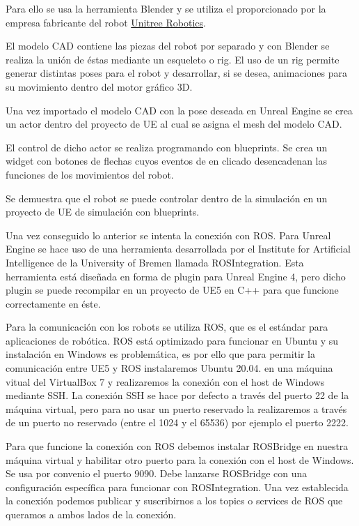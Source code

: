 \documentclass[a4paper, 12pt, spanish, twoside]{article}
\begin{document}
Para ello se usa la herramienta Blender y se utiliza el  proporcionado por la empresa fabricante del robot \href{https://www.unitree.com/}{Unitree Robotics}.  

El modelo CAD contiene las piezas del robot por separado y con Blender se realiza la unión de éstas mediante un esqueleto o rig. El uso de un rig permite generar distintas poses para el robot y desarrollar, si se desea, animaciones para su movimiento dentro del motor gráfico 3D. 

Una vez importado el modelo CAD con la pose deseada en Unreal Engine se crea un actor dentro del proyecto de UE al cual se asigna el mesh del modelo CAD.  

El control de dicho actor se realiza programando con blueprints. Se crea un widget con botones de flechas cuyos eventos de en clicado desencadenan las funciones de los movimientos del robot. 

Se demuestra que el robot se puede controlar dentro de la simulación en un proyecto de UE de simulación con blueprints. 


Una vez conseguido lo anterior se intenta la conexión con ROS. Para Unreal Engine se hace uso de una herramienta desarrollada por el Institute for Artificial Intelligence de la University of Bremen llamada ROSIntegration. Esta herramienta está diseñada en forma de plugin para Unreal Engine 4, pero dicho plugin se puede recompilar en un proyecto de UE5 en C++ para que funcione correctamente en éste.



Para la comunicación con los robots se utiliza ROS, que es el estándar para aplicaciones de robótica. ROS está optimizado para funcionar en Ubuntu y su instalación en Windows es problemática, es por ello que para permitir la comunicación entre UE5 y ROS instalaremos Ubuntu 20.04. en una máquina vitual del VirtualBox 7 y realizaremos la conexión con el host de Windows mediante SSH. La conexión SSH se hace por defecto a través del puerto 22 de la máquina virtual, pero para no usar un puerto reservado la realizaremos a través de un puerto no reservado (entre el 1024 y el 65536) por ejemplo el puerto 2222.

Para que funcione la conexión con ROS debemos instalar ROSBridge en nuestra máquina virtual y habilitar otro puerto para la conexión con el host de Windows. Se usa por convenio el puerto 9090. Debe lanzarse ROSBridge con una configuración específica para funcionar con ROSIntegration. Una vez establecida la conexión podemos publicar y suscribirnos a los topics o services de ROS que queramos a ambos lados de la conexión.
\end{document}
